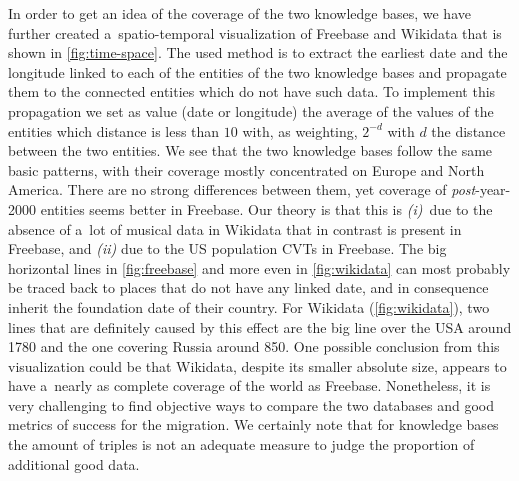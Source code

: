 \documentclass{acm_proc_article-sp}
\begin{document}
In order to get an idea of the coverage of the two knowledge bases,
we have further created a~spatio-temporal visualization of Freebase and Wikidata 
that is shown in \autoref{fig:time-space}.
The used method is to extract the earliest date and the longitude
linked to each of the entities of the two knowledge bases
and propagate them to the connected entities which do not have such data.
To implement this propagation we set as value (date or longitude)
the average of the values of the entities which distance is less than $10$ with,
as weighting, $2^{-d}$ with $d$ the distance between the two entities.
We see that the two knowledge bases follow the same basic patterns,
with their coverage mostly concentrated on Europe and North America.
There are no strong differences between them,
yet coverage of \mbox{\emph{post}-year-2000} entities seems better in Freebase.
Our theory is that this is \emph{(i)}~due to the absence of a~lot of musical data in Wikidata
that in contrast is present in Freebase,
and \emph{(ii)} due to the US population CVTs in Freebase.
The big horizontal lines in \autoref{fig:freebase} and more even in \autoref{fig:wikidata}
can most probably be traced back to places that do not have any linked date,
and in consequence inherit the foundation date of their country.
For Wikidata (\autoref{fig:wikidata}), two lines that are definitely caused by this effect
are the big line over the USA around 1780
and the one covering Russia around 850.
One possible conclusion from this visualization could be that Wikidata,
despite its smaller absolute size, appears to have
a~nearly as complete coverage of the world as Freebase.
Nonetheless, it is very challenging to find objective ways to compare the two databases
and good metrics of success for the migration.
We certainly note that for knowledge bases the amount of triples is not an adequate measure
to judge the proportion of additional good data.
\end{document}
